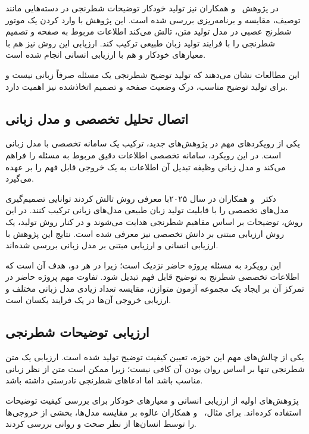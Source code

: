 در پژوهش  ~\cite{zang2019}و همکاران نیز تولید خودکار توضیحات شطرنجی در دسته‌هایی مانند توصیف، مقایسه و برنامه‌ریزی بررسی شده است. این پژوهش با وارد کردن یک موتور شطرنج عصبی در مدل تولید متن، تالش می‌کند اطلاعات مربوط به صفحه و تصمیم شطرنجی را با فرایند تولید زبان طبیعی ترکیب کند. ارزیابی این روش نیز هم با معیارهای خودکار و هم با ارزیابی انسانی انجام شده است.

این مطالعات نشان می‌دهند که تولید توضیح شطرنجی یک مسئله صرفاً زبانی نیست و برای تولید توضیح مناسب، درک وضعیت صفحه و تصمیم اتخاذشده نیز اهمیت دارد.

\subsection{اتصال تحلیل تخصصی و مدل زبانی}

یکی از رویکردهای مهم در پژوهش‌های جدید، ترکیب یک سامانه تخصصی با مدل زبانی است. در این رویکرد، سامانه تخصصی اطلاعات دقیق مربوط به مسئله را فراهم می‌کند و مدل زبانی وظیفه تبدیل آن اطلاعات به یک خروجی قابل فهم را بر عهده می‌گیرد.

دکتر  ~\cite{kim2025}و همکاران در سال  ۲۰۲۵با معرفی روش تالش کردند توانایی تصمیم‌گیری مدل‌های تخصصی را با قابلیت تولید زبان طبیعی مدل‌های زبانی ترکیب کنند. در این روش، توضیحات بر اساس مفاهیم شطرنجی هدایت می‌شوند و در کنار روش تولید، یک روش ارزیابی مبتنی بر دانش تخصصی نیز معرفی شده است. نتایج این پژوهش با ارزیابی انسانی و ارزیابی مبتنی بر مدل زبانی بررسی شده‌اند.

این رویکرد به مسئله پروژه حاضر نزدیک است؛ زیرا در هر دو، هدف آن است که اطلاعات تخصصی شطرنج به توضیح قابل فهم تبدیل شود. تفاوت مهم پروژه حاضر در تمرکز آن بر ایجاد یک مجموعه آزمون متوازن، مقایسه تعداد زیادی مدل زبانی مختلف و ارزیابی خروجی آن‌ها در یک فرایند یکسان است.

\subsection{ارزیابی توضیحات شطرنجی}

یکی از چالش‌های مهم این حوزه، تعیین کیفیت توضیح تولید شده است. ارزیابی یک متن شطرنجی تنها بر اساس روان بودن آن کافی نیست؛ زیرا ممکن است متن از نظر زبانی مناسب باشد اما ادعاهای شطرنجی نادرستی داشته باشد.

پژوهش‌های اولیه از ارزیابی انسانی و معیارهای خودکار برای بررسی کیفیت توضیحات استفاده کرده‌اند. برای مثال، ~\cite{jhamtani2018}و همکاران عالوه بر مقایسه مدل‌ها، بخشی از خروجی‌ها را توسط انسان‌ها از نظر صحت و روانی بررسی کردند.

